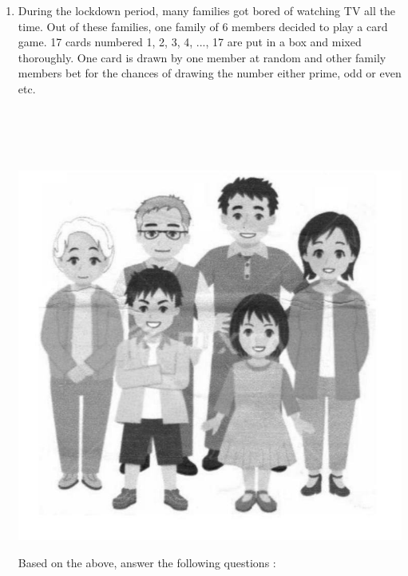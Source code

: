 \documentclass{exam}
\begin{document}
	\begin{enumerate}

		\item During the lockdown period, many families got bored of watching TV all the time. Out of these families, one family of 6 members decided to play a card game. 17 cards numbered 1, 2, 3, 4, ..., 17 are put in a box and mixed thoroughly. One card is drawn by one member at random and other family members bet for the chances of drawing the number either prime, odd or even etc. 
		\\
		\\
		\\
		\\
		\\
		\begin{center}
			\includegraphics[scale = 0.3]{figs/1.jpg}
		\end{center}
		Based on the above, answer the following questions : 
		

\end{enumerate}
\end{document}

